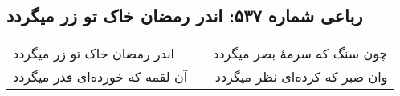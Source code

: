 \begin{center}
\section*{رباعی شماره ۵۳۷: اندر رمضان خاک تو زر میگردد}
\label{sec:0537}
\begin{longtable}{l p{0.5cm} r}
اندر رمضان خاک تو زر میگردد
&&
چون سنگ که سرمهٔ بصر میگردد
\\
آن لقمه که خورده‌ای قذر میگردد
&&
وان صبر که کرده‌ای نظر میگردد
\\
\end{longtable}
\end{center}
